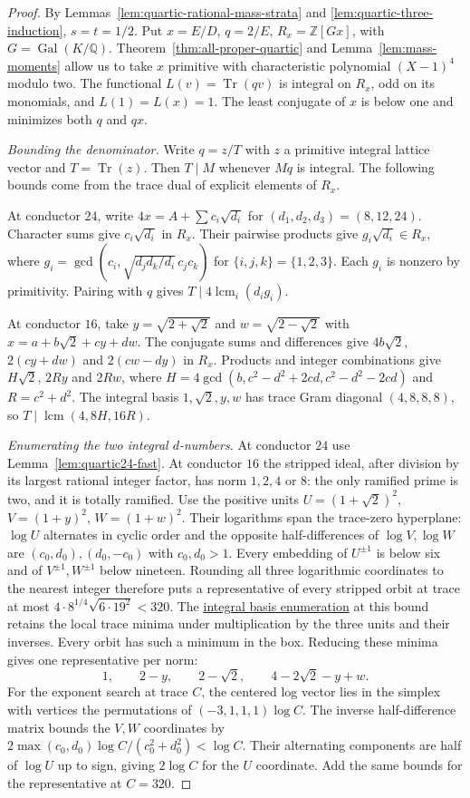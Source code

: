 \documentclass[11pt,reqno]{amsart}
\newcommand{\codecheck}[2]{\href{https://github.com/sebastienpalcoux/grothendieck-ring-classification/blob/d5750105bb5758f3ad38d2e5464dfcc12c019816/supplements/rank6/sphericality/#1}{#2}}
\theoremstyle{remark}\newtheorem{remark}[theorem]{Remark}
\numberwithin{equation}{section}
\begin{document}
\begin{proof}
By Lemmas~\ref{lem:quartic-rational-mass-strata} and
\ref{lem:quartic-three-induction}, $s=t=1/2$. Put $x=E/D$, $q=2/E$,
$R_x=\mathbb Z[Gx]$, with $G=\operatorname{Gal}(K/\mathbb Q)$.
Theorem~\ref{thm:all-proper-quartic} and Lemma~\ref{lem:mass-moments}
allow us to take $x$ primitive with characteristic polynomial
$(X-1)^4$ modulo two. The functional $L(v)=\operatorname{Tr}(qv)$
is integral on $R_x$, odd on its monomials, and $L(1)=L(x)=1$.
The least conjugate of $x$ is below one and minimizes both $q$ and $qx$.

\emph{Bounding the denominator.} Write $q=z/T$ with $z$ a primitive
integral lattice vector and $T=\operatorname{Tr}(z)$. Then $T\mid M$
whenever $Mq$ is integral. The following bounds come from the trace
dual of explicit elements of $R_x$.

At conductor $24$, write $4x=A+\sum c_i\sqrt{d_i}$ for
$(d_1,d_2,d_3)=(8,12,24)$. Character sums give $c_i\sqrt{d_i}$ in
$R_x$. Their pairwise products give $g_i\sqrt{d_i}\in R_x$, where
$g_i=\gcd(c_i,\sqrt{d_jd_k/d_i}\,c_jc_k)$ for $\{i,j,k\}=\{1,2,3\}$.
Each $g_i$ is nonzero by primitivity. Pairing with $q$ gives
$T\mid4\operatorname{lcm}_i(d_i g_i)$.

At conductor $16$, take $y=\sqrt{2+\sqrt2}$ and $w=\sqrt{2-\sqrt2}$
with $x=a+b\sqrt2+cy+dw$. The conjugate sums and differences give
$4b\sqrt2$, $2(cy+dw)$ and $2(cw-dy)$ in $R_x$. Products and
integer combinations give $H\sqrt2$, $2Ry$ and $2Rw$, where
$H=4\gcd(b,c^2-d^2+2cd,c^2-d^2-2cd)$ and $R=c^2+d^2$.
The integral basis $1,\sqrt2,y,w$ has trace Gram diagonal $(4,8,8,8)$,
so $T\mid\operatorname{lcm}(4,8H,16R)$.

\emph{Enumerating the two integral $d$-numbers.} At conductor $24$
use Lemma~\ref{lem:quartic24-fast}. At conductor $16$ the stripped
ideal, after division by its largest rational integer factor, has norm
$1,2,4$ or $8$: the only ramified prime is two, and it is totally
ramified. Use the positive units
$U=(1+\sqrt2)^2$, $V=(1+y)^2$, $W=(1+w)^2$. Their logarithms span
the trace-zero hyperplane: $\log U$ alternates in cyclic order and
the opposite half-differences of $\log V,\log W$ are
$(c_0,d_0),(d_0,-c_0)$ with $c_0,d_0>1$.
Every embedding of $U^{\pm1}$ is below six and of $V^{\pm1},W^{\pm1}$
below nineteen. Rounding all three logarithmic coordinates to the
nearest integer therefore puts a representative of every stripped
orbit at trace at most $4\cdot8^{1/4}\sqrt{6\cdot19^2}<320$.
The \codecheck{field_checks/half/seeds16.cpp}{integral basis enumeration}
at this bound retains the local trace minima under multiplication by
the three units and their inverses. Every orbit has such a minimum
in the box. Reducing these minima gives one representative
per norm:
\[
 1,\qquad 2-y,\qquad 2-\sqrt2,\qquad 4-2\sqrt2-y+w.
\]
For the exponent search at trace $C$, the centered log vector lies in
the simplex with vertices the permutations of $(-3,1,1,1)\log C$.
The inverse half-difference matrix bounds the $V,W$ coordinates by
$2\max(c_0,d_0)\log C/(c_0^2+d_0^2)<\log C$. Their alternating
components are half of $\log U$ up to sign, giving $2\log C$ for
the $U$ coordinate. Add the same bounds for the representative at
$C=320$.


\end{proof}
\end{document}
